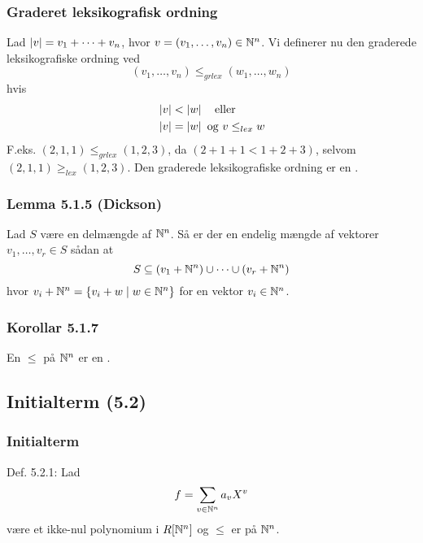 \subsubsection{Graderet leksikografisk ordning}
\label{Graderet leksikografisk ordning}
Lad $\left | v \right | = v_1 + \cdots + v_n$, hvor $v = (v_1,\ldots,v_n) \in \mathbb{N}^n$. Vi
definerer nu den graderede leksikografiske ordning ved
\begin{equation*}
  (v_1,\ldots,v_n) \leq_{grlex} (w_1,\ldots,w_n)
\end{equation*}
hvis
\begin{align*}
  &\left | v \right | < \left | w \right | \quad \text{eller}\\
  &\left | v \right | = \left | w \right | \text{ og } v \leq_{lex} w
\end{align*}
F.eks. $(2,1,1) \leq_{grlex} (1,2,3)$, da $(2 + 1 + 1 < 1 + 2 + 3)$, selvom\\
$(2,1,1) \geq_{lex} (1,2,3)$. Den graderede leksikografiske ordning er en
.

\subsubsection{Lemma 5.1.5 (Dickson)}
\label{Lemma 5.1.5 (Dickson)}
Lad $S$ være en delmængde af $\mathbb{N}^n$. Så er der en endelig mængde af vektorer
$v_1,\ldots,v_r \in S$ sådan at
\begin{equation*}
  S \subseteq (v_1 + \mathbb{N}^n) \cup \cdots \cup (v_r + \mathbb{N}^n)
\end{equation*}
hvor $v_i + \mathbb{N}^n = \{ v_i + w \mid w \in \mathbb{N}^n \}$ for en vektor $v_i \in
\mathbb{N}^n$.

\subsubsection{Korollar 5.1.7}
\label{Korollar 5.1.7}
En  $\leq$ på $\mathbb{N}^n$ er en .

\subsection{Initialterm (5.2)}
\label{Initialterm (5.2)}
\subsubsection{Initialterm}
\label{Initialterm}
Def. 5.2.1: Lad
\begin{equation*}
  f = \sum_{v \in \mathbb{N}^n} a_v X^v
\end{equation*}
være et ikke-nul polynomium i $R[\mathbb{N}^n]$ og $\leq$ er  på
$\mathbb{N}^n$.


